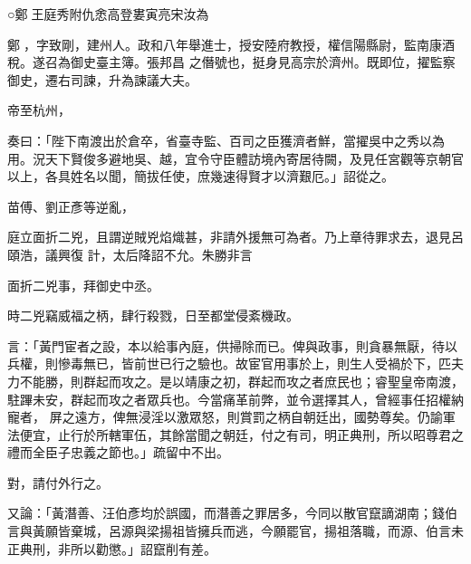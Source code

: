 
\begin{pinyinscope}

 ○鄭𣪝王庭秀附仇悆高登婁寅亮宋汝為



 鄭𣪝，字致剛，建州人。政和八年舉進士，授安陸府教授，權信陽縣尉，監南康酒稅。遂召為御史臺主簿。張邦昌
 之僭號也，挺身見高宗於濟州。既即位，擢監察御史，遷右司諫，升為諫議大夫。



 帝至杭州，
 
  
   
  
 
 奏曰：「陛下南渡出於倉卒，省臺寺監、百司之臣獲濟者鮮，當擢吳中之秀以為用。況天下賢俊多避地吳、越，宜令守臣體訪境內寄居待闕，及見任宮觀等京朝官以上，各具姓名以聞，簡拔任使，庶幾速得賢才以濟艱厄。」詔從之。



 苗傅、劉正彥等逆亂，
 
  
   
  
 
 庭立面折二兇，且謂逆賊兇焰熾甚，非請外援無可為者。乃上章待罪求去，退見呂頤浩，議興復
 計，太后降詔不允。朱勝非言
 
  
   
  
 
 面折二兇事，拜御史中丞。



 時二兇竊威福之柄，肆行殺戮，日至都堂侵紊機政。
 
  
   
  
 
 言：「黃門宦者之設，本以給事內庭，供掃除而已。俾與政事，則貪暴無厭，待以兵權，則慘毒無已，皆前世已行之驗也。故宦官用事於上，則生人受禍於下，匹夫力不能勝，則群起而攻之。是以靖康之初，群起而攻之者庶民也；睿聖皇帝南渡，駐蹕未安，群起而攻之者眾兵也。今當痛革前弊，並令選擇其人，曾經事任招權納寵者，
 屏之遠方，俾無浸淫以激眾怒，則賞罰之柄自朝廷出，國勢尊矣。仍諭軍法便宜，止行於所轄軍伍，其餘當聞之朝廷，付之有司，明正典刑，所以昭尊君之禮而全臣子忠義之節也。」疏留中不出。
 
  
   
  
 
 對，請付外行之。



 又論：「黃潛善、汪伯彥均於誤國，而潛善之罪居多，今同以散官竄謫湖南；錢伯言與黃願皆棄城，呂源與梁揚祖皆擁兵而逃，今願罷官，揚祖落職，而源、伯言未正典刑，非所以勸懲。」詔竄削有差。




\end{pinyinscope}
